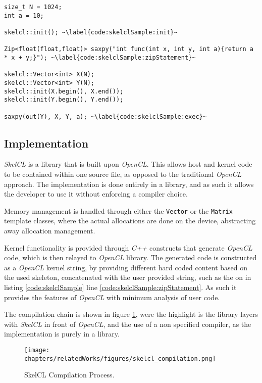 \begin{lstlisting}[caption={The \textit{SAXPY} computation in \textit{SkelCL}.}, label=code:skelclSample] 
size_t N = 1024;
int a = 10;

skelcl::init(); ~\label{code:skelclSample:init}~

Zip<float(float,float)> saxpy("int func(int x, int y, int a){return a * x + y;}"); ~\label{code:skelclSample:zipStatement}~

skelcl::Vector<int> X(N);      
skelcl::Vector<int> Y(N);
skelcl::init(X.begin(), X.end()); 
skelcl::init(Y.begin(), Y.end());

saxpy(out(Y), X, Y, a); ~\label{code:skelclSample:exec}~
\end{lstlisting}

\subsection{Implementation}
\textit{SkelCL} is a library that is built upon \textit{OpenCL}. This allows host and kernel code to be contained within one source file, as opposed to the traditional \textit{OpenCL} approach.
The implementation is done entirely in a library, and as such it allows the developer to use it without enforcing a compiler choice.

Memory management is handled through either the \texttt{Vector} or the \texttt{Matrix} template classes, where the actual allocations are done on the device, abstracting away allocation management.

Kernel functionality is provided through \textit{C++} constructs that generate \textit{OpenCL} code, which is then relayed to \textit{OpenCL} library. The generated code is constructed as a \textit{OpenCL} kernel string, by providing different hard coded content based on the used skeleton, concatenated with the user provided string, such as the on in listing \ref{code:skelclSample} line \ref{code:skelclSample:zipStatement}. As such it provides the features of \textit{OpenCL} with minimum analysis of user code.

The compilation chain is shown in figure \ref{fig:skelclCompilation}, were the highlight is the library layers with \textit{SkelCL} in front of \textit{OpenCL}, and the use of a non specified compiler, as the implementation is purely in a library.
\begin{figure}[H]
\center
\texttt{[image: chapters/relatedWorks/figures/skelcl\_compilation.png]}
\caption{SkelCL Compilation Process.}
\label{fig:skelclCompilation}
\end{figure}

